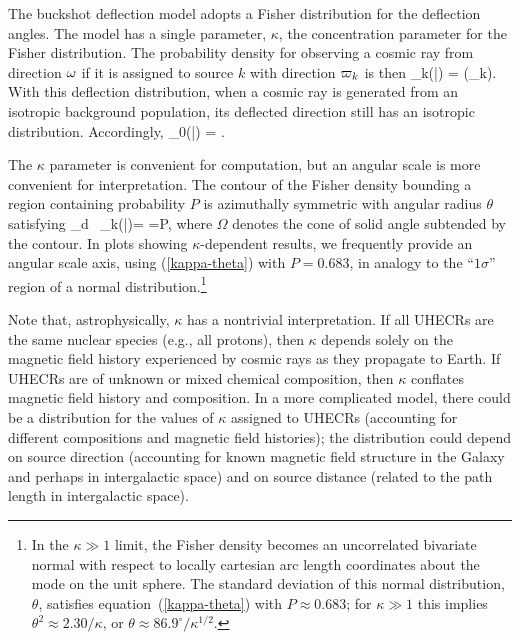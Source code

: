 The buckshot deflection model adopts a Fisher distribution for the
deflection angles.  The model has a single parameter, $\kappa$, the
concentration parameter for the Fisher distribution.  The probability
density for observing a cosmic ray from direction $\omega$ if it is assigned
to source $k$ with direction $\varpi_k$ is then
\be
\rho_k(\tdrxn|\kappa)
  = \frac{\kappa}{4\pi\sinh(\kappa)}\exp(\kappa\tdrxn\cdot\hdrxn_k).
\label{rho-def}
\ee
With this deflection distribution, when a cosmic ray is generated from an
isotropic background population, its deflected direction still has an
isotropic distribution.  Accordingly,
\be
\rho_0(\tdrxn|\kappa) =  .
\label{rho-iso}
\ee

The $\kappa$ parameter is convenient for computation, but an angular scale
is more convenient for interpretation.  The contour of the Fisher density
bounding a region containing probability $P$ is azimuthally symmetric
with angular radius $\theta$ satisfying
\be
\int_{\Omega}d \tdrxn \, \rho_k(\tdrxn|\kappa)= 
  =P,
\label{kappa-theta}
\ee
where $\Omega$ denotes the cone of solid angle subtended by the contour. In
plots showing $\kappa$-dependent results, we frequently provide an angular
scale axis, using (\ref{kappa-theta}) with $P=0.683$, in analogy to the
``$1\sigma$'' region of a normal distribution.\footnote{In the $\kappa\gg 1$
limit, the Fisher density becomes an uncorrelated bivariate normal with
respect to locally cartesian arc length coordinates about the mode on the
unit sphere.  The standard deviation of this normal distribution, $\theta$,
satisfies equation~(\ref{kappa-theta}) with $P \approx 0.683$; for $\kappa\gg
1$ this implies $\theta^2 \approx 2.30/\kappa$, or
$\theta \approx 86.9^\circ/\kappa^{1/2}$.}


Note that, astrophysically, $\kappa$ has a nontrivial interpretation.  If
all UHECRs are the same nuclear species (e.g., all protons), then $\kappa$
depends solely on the magnetic field history experienced by cosmic rays as
they propagate to Earth.  If UHECRs are of unknown or mixed chemical
composition, then $\kappa$ conflates magnetic field history and composition.
In a more complicated model, there could be a distribution for the values
of $\kappa$ assigned to UHECRs (accounting for different compositions and
magnetic field histories); the distribution could depend on source direction
(accounting for known magnetic field structure in the Galaxy and perhaps in
intergalactic space) and on source distance (related to the path length in
intergalactic space).

